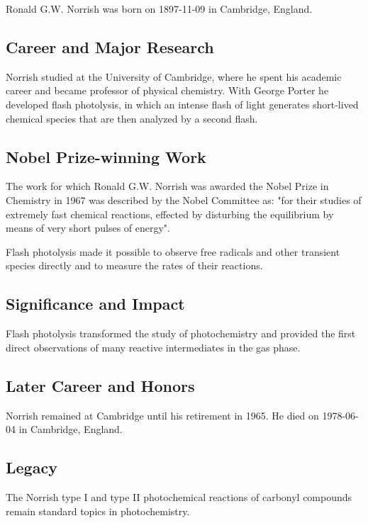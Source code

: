 Ronald G.W. Norrish was born on 1897-11-09 in Cambridge, England.

\subsection*{Career and Major Research}

Norrish studied at the University of Cambridge, where he spent his academic career and became professor of physical chemistry. With George Porter he developed flash photolysis, in which an intense flash of light generates short-lived chemical species that are then analyzed by a second flash.

\subsection*{Nobel Prize-winning Work}

The work for which Ronald G.W. Norrish was awarded the Nobel Prize in Chemistry in 1967 was described by the Nobel Committee as: "for their studies of extremely fast chemical reactions, effected by disturbing the equilibrium by means of very short pulses of energy".

Flash photolysis made it possible to observe free radicals and other transient species directly and to measure the rates of their reactions.

\subsection*{Significance and Impact}

Flash photolysis transformed the study of photochemistry and provided the first direct observations of many reactive intermediates in the gas phase.

\subsection*{Later Career and Honors}

Norrish remained at Cambridge until his retirement in 1965. He died on 1978-06-04 in Cambridge, England.

\subsection*{Legacy}

The Norrish type I and type II photochemical reactions of carbonyl compounds remain standard topics in photochemistry.


